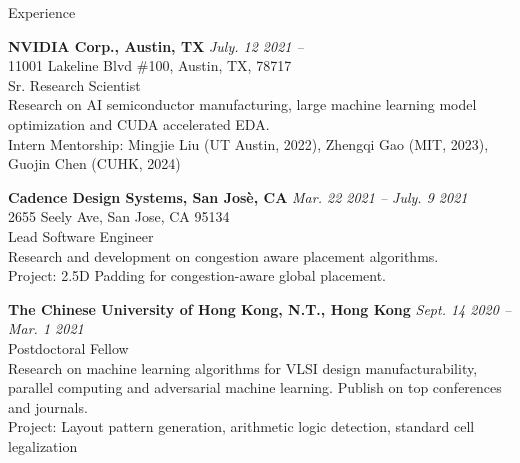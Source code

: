 
\begin{rSection}{Experience}

{\bf NVIDIA Corp., Austin, TX}         \hfill {\em July. 12 2021 -- } \\
11001 Lakeline Blvd \#100, Austin, TX, 78717 \\
Sr. Research Scientist \\
Research on AI semiconductor manufacturing, large machine learning model optimization and CUDA accelerated EDA. \\
Intern Mentorship: Mingjie Liu (UT Austin, 2022), Zhengqi Gao (MIT, 2023), Guojin Chen (CUHK, 2024)
	
{\bf Cadence Design Systems, San Jos\`{e}, CA}         \hfill {\em Mar. 22 2021 -- July. 9 2021 } \\
2655 Seely Ave, San Jose, CA 95134 \\
Lead Software Engineer \\
Research and development on congestion aware placement algorithms. \\
Project: 2.5D Padding for congestion-aware global placement.
	
{\bf The Chinese University of Hong Kong, N.T., Hong Kong}         \hfill {\em Sept. 14 2020 -- Mar. 1 2021} \\
Postdoctoral Fellow \\
Research on machine learning algorithms for VLSI design manufacturability, parallel computing and adversarial machine learning. Publish on top conferences and journals. \\
Project: Layout pattern generation, arithmetic logic detection, standard cell legalization 


	



\end{rSection}


